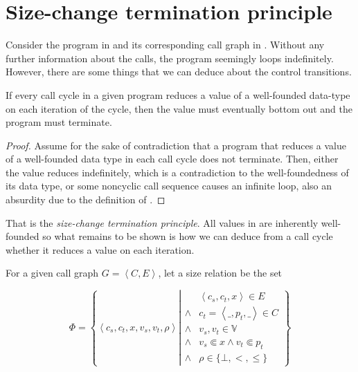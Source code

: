 \section{Size-change termination
principle}\label{section:size-change-principle}

Consider the program in  and its corresponding call
graph in . Without any further information about
the calls, the program seemingly loops indefinitely. However,
there are some things that we can deduce about the control transitions.

\begin{theorem}\label{theorem:size-change} If every call cycle in a given
program reduces a value of a well-founded data-type on each iteration of the
cycle, then the value must eventually bottom out and the program must
terminate.\end{theorem}

\begin{proof} Assume for the sake of contradiction that a program that reduces
a value of a well-founded data type in each call cycle does not terminate.
Then, either the value reduces indefinitely, which is a contradiction to the
well-foundedness of its data type, or some noncyclic call sequence causes an
infinite loop, also an absurdity due to the definition of \D{}. \end{proof}

That is the \emph{size-change termination principle}\cite{size-change}. All
values in \D{} are inherently well-founded so what remains to be shown is how
we can deduce from a call cycle whether it reduces a value on each iteration.

\begin{definition}\label{definition:size-relation} For a given call
graph $G = \left\langle C,E \right\rangle$, let a size relation be the set

$$
\Phi = \left\{ \left\langle c_s, c_t,x, v_s, v_t, \rho \right\rangle \left| 
\begin{array}{ll}
&\left\langle c_s, c_t,x \right\rangle \in E\\
\wedge&c_t = \left\langle \_, p_t, \_ \right\rangle \in C \\
\wedge&v_s,v_t\in\mathbb{V}\\
\wedge&v_s\Subset x \wedge v_t \Subset p_t \\
\wedge&\rho\in\{\bot, <, \leq\}
\end{array}
\right.\right\}
$$

\end{definition}

